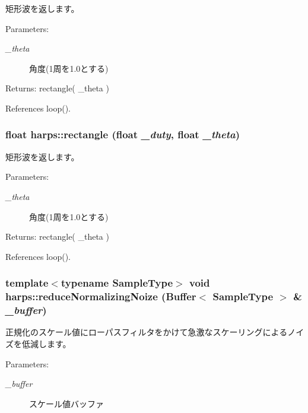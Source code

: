 矩形波を返します。 \begin{Desc}
\item[Parameters:]
\begin{description}
\item[{\em \_\-theta}]角度(1周を1.0とする) \end{description}
\end{Desc}
\begin{Desc}
\item[Returns:]rectangle( \_\-theta ) \end{Desc}


References loop().
\subsubsection[rectangle]{\setlength{\rightskip}{0pt plus 5cm}float harps::rectangle (float {\em \_\-duty}, \/  float {\em \_\-theta})\hspace{0.3cm}{\tt  [inline]}}\label{namespaceharps_ec41e89fe7065da3484b8e541bdd42a1}


矩形波を返します。 \begin{Desc}
\item[Parameters:]
\begin{description}
\item[{\em \_\-theta}]角度(1周を1.0とする) \end{description}
\end{Desc}
\begin{Desc}
\item[Returns:]rectangle( \_\-theta ) \end{Desc}


References loop().
\subsubsection[reduceNormalizingNoize]{\setlength{\rightskip}{0pt plus 5cm}template$<$typename SampleType$>$ void harps::reduceNormalizingNoize (Buffer$<$ SampleType $>$ \& {\em \_\-buffer})\hspace{0.3cm}{\tt  [inline]}}\label{namespaceharps_9f18f91c4acdcbfe42895fc812853066}


正規化のスケール値にローパスフィルタをかけて急激なスケーリングによるノイズを低減します。 \begin{Desc}
\item[Parameters:]
\begin{description}
\item[{\em \_\-buffer}]スケール値バッファ \end{description}
\end{Desc}



